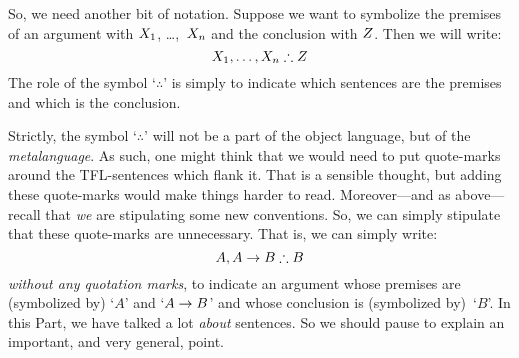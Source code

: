 
So, we need another bit of notation. Suppose we want to symbolize the premises of an argument with $X_1$, \dots,~$X_n$ and the conclusion with $Z$. Then we will write:
$$\metaX_1, \ldots, \metaX_n \therefore \metaZ$$
The role of the symbol `$\therefore$' is simply to indicate which sentences are the premises and which is the conclusion.


Strictly, the symbol `$\therefore$' will not be a part of the object language, but of the \emph{metalanguage}. As such, one might think that we would need to put quote-marks around the TFL-sentences which flank it. That is a sensible thought, but adding these quote-marks would make things harder to read. Moreover---and as above---recall that \emph{we} are stipulating some new conventions. So, we can simply stipulate that these quote-marks are unnecessary. That is, we can simply write:
$$A, A \eif B \therefore B$$
\emph{without any quotation marks}, to indicate an argument whose premises are (symbolized by) `$A$' and `$A \rightarrow B$' and whose conclusion is (symbolized by)~`$B$'.
In this Part, we have talked a lot \emph{about} sentences. So we should pause to explain an important, and very general, point.

